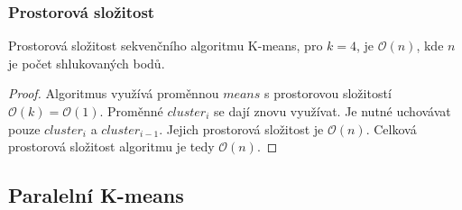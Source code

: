 \documentclass[a4paper, 11pt, fleqn]{scrartcl}
\begin{document}
      \subsubsection{Prostorová složitost}
        Prostorová složitost sekvenčního algoritmu K-means, pro $k = 4$, je $\mathcal{O}(n)$, kde $n$ je počet shlukovaných bodů.

        \begin{proof}
          Algoritmus využívá proměnnou $means$ s prostorovou složitostí $\mathcal{O}(k) = \mathcal{O}(1)$. Proměnné $cluster_i$ se dají znovu využívat. Je nutné uchovávat pouze $cluster_i$ a $cluster_{i-1}$. Jejich prostorová složitost je $\mathcal{O}(n)$. Celková prostorová složitost algoritmu je tedy $\mathcal{O}(n)$.
        \end{proof}

    \subsection{Paralelní K-means}
\end{document}
